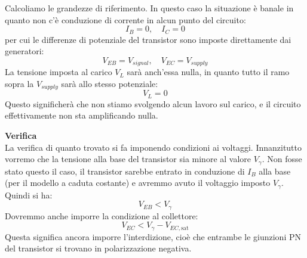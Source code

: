 \documentclass[a4paper,11pt]{article}
\begin{document}
Calcoliamo le grandezze di riferimento. In questo caso la situazione è banale in quanto non c'è conduzione di corrente in alcun punto del circuito:
$$
I_B = 0, \quad I_C = 0
$$
per cui le differenze di potenziale del transistor sono imposte direttamente dai generatori:
$$
V_{EB} = V_{signal}, \quad V_{EC} = V_{supply}
$$
La tensione imposta al carico $V_L$ sarà anch'essa nulla, in quanto tutto il ramo sopra la $V_{supply}$ sarà allo stesso potenziale:
$$
V_L = 0
$$
Questo significherà che non stiamo svolgendo alcun lavoro sul carico, e il circuito effettivamente non sta amplificando nulla. 

\par\smallskip
\noindent
\textbf{\textsf{Verifica}} \\
\noindent
La verifica di quanto trovato si fa imponendo condizioni ai voltaggi. Innanzitutto vorremo che la tensione alla base del transistor sia minore al valore $V_\gamma$. Non fosse stato questo il caso, il transistor sarebbe entrato in conduzione di $I_B$ alla base (per il modello a caduta costante) e avremmo avuto il voltaggio imposto $V_\gamma$. Quindi si ha:
$$
V_{EB} < V_\gamma
$$
Dovremmo anche imporre la condizione al collettore:
$$
V_{EC} < V_\gamma - V_{EC,\mathrm{sat}}
$$
Questa significa ancora imporre l'interdizione, cioè che entrambe le giunzioni PN del transistor si trovano in polarizzazione negativa.
\end{document}
